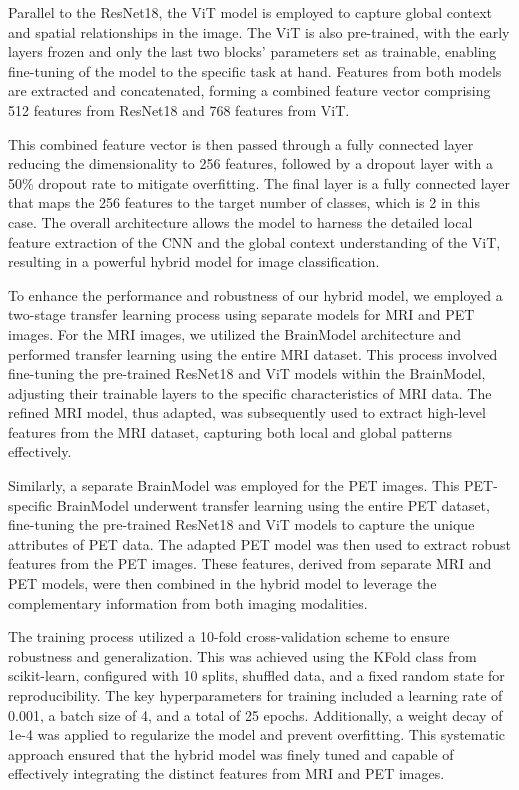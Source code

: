Parallel to the ResNet18, the ViT model is employed to capture global context and spatial relationships in the image. The ViT is also pre-trained, with the early layers frozen and only the last two blocks' parameters set as trainable, enabling fine-tuning of the model to the specific task at hand. Features from both models are extracted and concatenated, forming a combined feature vector comprising 512 features from ResNet18 and 768 features from ViT.

This combined feature vector is then passed through a fully connected layer reducing the dimensionality to 256 features, followed by a dropout layer with a 50\% dropout rate to mitigate overfitting. The final layer is a fully connected layer that maps the 256 features to the target number of classes, which is 2 in this case. The overall architecture allows the model to harness the detailed local feature extraction of the CNN and the global context understanding of the ViT, resulting in a powerful hybrid model for image classification.

To enhance the performance and robustness of our hybrid model, we employed a two-stage transfer learning process using separate models for MRI and PET images. For the MRI images, we utilized the BrainModel architecture and performed transfer learning using the entire MRI dataset. This process involved fine-tuning the pre-trained ResNet18 and ViT models within the BrainModel, adjusting their trainable layers to the specific characteristics of MRI data. The refined MRI model, thus adapted, was subsequently used to extract high-level features from the MRI dataset, capturing both local and global patterns effectively.

Similarly, a separate BrainModel was employed for the PET images. This PET-specific BrainModel underwent transfer learning using the entire PET dataset, fine-tuning the pre-trained ResNet18 and ViT models to capture the unique attributes of PET data. The adapted PET model was then used to extract robust features from the PET images. These features, derived from separate MRI and PET models, were then combined in the hybrid model to leverage the complementary information from both imaging modalities.

The training process utilized a 10-fold cross-validation scheme to ensure robustness and generalization. This was achieved using the KFold class from scikit-learn, configured with 10 splits, shuffled data, and a fixed random state for reproducibility. The key hyperparameters for training included a learning rate of 0.001, a batch size of 4, and a total of 25 epochs. Additionally, a weight decay of 1e-4 was applied to regularize the model and prevent overfitting. This systematic approach ensured that the hybrid model was finely tuned and capable of effectively integrating the distinct features from MRI and PET images.

